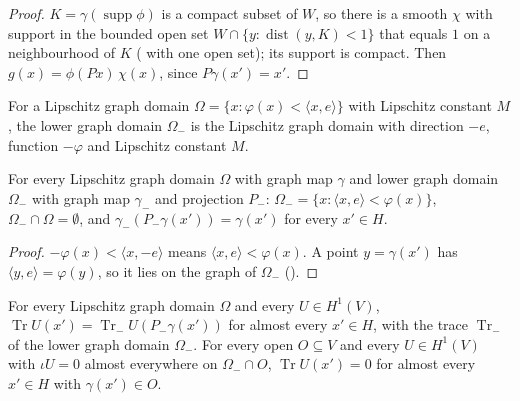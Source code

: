 \begin{proof}
\leanok
$K = \gamma(\operatorname{supp} \phi)$ is a compact subset of $W$, so there is a smooth $\chi$
with support in the bounded open set $W \cap \{y : \operatorname{dist}(y, K) < 1\}$ that equals
$1$ on a neighbourhood of $K$ ( with one open set); its support is
compact. Then $g(x) = \phi(P x) \, \chi(x)$, since $P \gamma(x') = x'$.
\end{proof}

\begin{definition}
\label{def:lower-graph-domain}
\leanok
{}
For a Lipschitz graph domain $\Omega = \{x : \varphi(x) < \langle x, e \rangle\}$ with Lipschitz
constant $M$, the lower graph domain $\Omega_-$ is the Lipschitz graph domain with direction $-e$,
function $-\varphi$ and Lipschitz constant $M$.
\end{definition}

\begin{lemma}
\label{lem:lower-graph-domain}
\leanok
{}
For every Lipschitz graph domain $\Omega$ with graph map $\gamma$ and lower graph domain
$\Omega_-$ with graph map $\gamma_-$ and projection $P_-$:
$\Omega_- = \{x : \langle x, e \rangle < \varphi(x)\}$, $\Omega_- \cap \Omega = \emptyset$, and
$\gamma_-(P_- \gamma(x')) = \gamma(x')$ for every $x' \in H$.
\end{lemma}

\begin{proof}
\leanok
$-\varphi(x) < \langle x, -e \rangle$ means $\langle x, e \rangle < \varphi(x)$. A point
$y = \gamma(x')$ has $\langle y, e \rangle = \varphi(y)$, so it lies on the graph of $\Omega_-$
().
\end{proof}

\begin{theorem}
\label{thm:traces-both-sides}
\leanok
{}
For every Lipschitz graph domain $\Omega$ and every $U \in H^1(V)$,
$\operatorname{Tr} U(x') = \operatorname{Tr}_- U(P_- \gamma(x'))$ for almost every $x' \in H$,
with the trace $\operatorname{Tr}_-$ of the lower graph domain $\Omega_-$. For every open
$O \subseteq V$ and every $U \in H^1(V)$ with $\iota U = 0$ almost everywhere on $\Omega_- \cap O$,
$\operatorname{Tr} U(x') = 0$ for almost every $x' \in H$ with $\gamma(x') \in O$.
\end{theorem}

